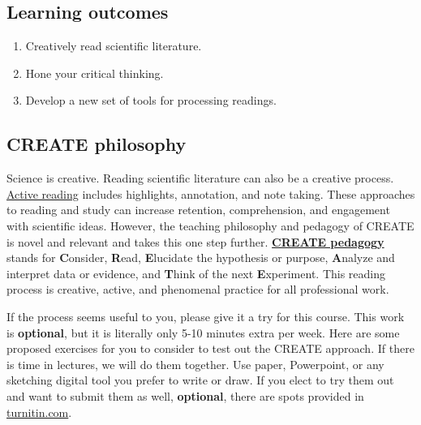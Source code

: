 \documentclass[
]{book}
\providecommand{\tightlist}{%
  \setlength{\itemsep}{0pt}\setlength{\parskip}{0pt}}
\begin{document}
\hypertarget{learning-outcomes-3}{%
\subsection*{Learning outcomes}\label{learning-outcomes-3}}

\begin{enumerate}
\def\labelenumi{\arabic{enumi}.}
\tightlist
\item
  Creatively read scientific literature.\\
\item
  Hone your critical thinking.\\
\item
  Develop a new set of tools for processing readings.
\end{enumerate}

\hypertarget{create-philosophy}{%
\subsection*{CREATE philosophy}\label{create-philosophy}}

Science is creative. Reading scientific literature can also be a creative process. \href{https://help.open.ac.uk/active-reading}{Active reading} includes highlights, annotation, and note taking. These approaches to reading and study can increase retention, comprehension, and engagement with scientific ideas. However, the teaching philosophy and pedagogy of CREATE is novel and relevant and takes this one step further. \href{https://academic.oup.com/genetics/article/176/3/1381/6062159}{\textbf{CREATE pedagogy}} stands for \textbf{C}onsider, \textbf{R}ead, \textbf{E}lucidate the hypothesis or purpose, \textbf{A}nalyze and interpret data or evidence, and \textbf{T}hink of the next \textbf{E}xperiment. This reading process is creative, active, and phenomenal practice for all professional work.

If the process seems useful to you, please give it a try for this course. This work is \textbf{optional}, but it is literally only 5-10 minutes extra per week. Here are some proposed exercises for you to consider to test out the CREATE approach. If there is time in lectures, we will do them together. Use paper, Powerpoint, or any sketching digital tool you prefer to write or draw. If you elect to try them out and want to submit them as well, \textbf{optional}, there are spots provided in \href{https://turnitin.com}{turnitin.com}.
\end{document}
